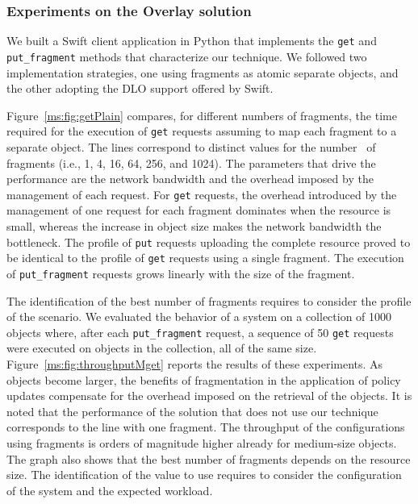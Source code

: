 \subsubsection{Experiments on the Overlay solution}
We built a Swift client application in Python that implements the {\tt get} and {\tt put\_fragment} methods that characterize our technique. We followed two implementation strategies, one using fragments as atomic separate objects, and the other adopting the DLO support offered by Swift.

Figure~\ref{ms:fig:getPlain} compares, for different numbers of fragments, the time required for the execution of {\tt get} requests assuming to map each fragment to a separate object. The lines correspond to distinct values for the number \fnum\ of fragments (i.e., 1, 4, 16, 64, 256, and 1024). The parameters that drive the performance are the network bandwidth and the overhead imposed by the management of each request. For {\tt get} requests, the overhead introduced by the management of one request for each fragment dominates when the resource is small, whereas the increase in object size makes the network bandwidth the bottleneck. The profile of {\tt put} requests uploading the complete resource proved to be identical to the profile of {\tt get} requests using a single fragment. The execution of {\tt put\_fragment} requests grows linearly with the size of the fragment.

The identification of the best number of fragments requires to consider the profile of the scenario. We evaluated the behavior of a system on a collection of 1000 objects where, after each {\tt put\_fragment} request, a sequence of 50 {\tt get} requests were executed on objects in the collection, all of the same size. Figure~\ref{ms:fig:throughputMget} reports the results of these experiments. As objects become larger, the benefits of fragmentation in the application of policy updates compensate for the overhead imposed on the retrieval of the objects. It is noted that the performance of the solution that does not use our technique corresponds to the line with one fragment. The throughput of the configurations using fragments is orders of magnitude higher already for medium-size objects. The graph also shows that the best number of fragments depends on the resource size. The identification of the value to use requires to consider the configuration of the system and the expected workload.

